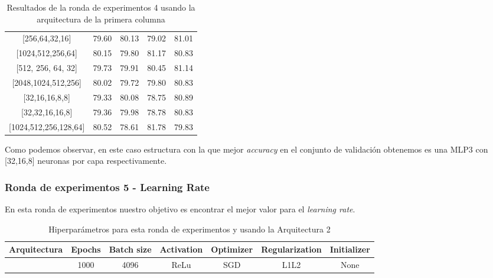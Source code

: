 \documentclass{article}
\begin{document}
\begin{center}
\begin{table}[h!]
\begin{tabular}{c|cccc}
{[}256,64,32,16{]}        & 79.60          & 80.13          & 79.02          & 81.01          \\
{[}1024,512,256,64{]}     & 80.15          & 79.80          & 81.17          & 80.83          \\
{[}512, 256, 64, 32{]}    & 79.73          & 79.91          & 80.45          & 81.14          \\
{[}2048,1024,512,256{]}   & 80.02          & 79.72          & 79.80          & 80.83          \\
{[}32,16,16,8,8{]}        & 79.33          & 80.08          & 78.75          & 80.89          \\
{[}32,32,16,16,8{]}       & 79.36          & 79.98          & 78.78          & 80.83          \\
{[}1024,512,256,128,64{]} & 80.52          & 78.61          & 81.78          & 79.83          \\ \hline
\end{tabular}

                \caption{Resultados de la ronda de experimentos 4 usando la arquitectura de la primera columna}
                \label{tab:res-j-a0-e4}
                \end{table}
                \end{center}
		    
		    Como podemos observar, en este caso estructura con la que mejor \textit{accuracy} en el conjunto de validaci\'on obtenemos es una MLP3 con [32,16,8] neuronas por capa respectivamente.
      \newpage
\subsubsection{Ronda de experimentos 5 - Learning Rate}  
En esta ronda de experimentos nuestro objetivo es encontrar el mejor valor para el \textit{learning rate}. 

			\begin{table}[h!]
				\begin{center}
					\begin{tabular}{| c | c | c | c | c | c | c |}
						\textbf{Arquitectura} & \textbf{Epochs} & \textbf{Batch size} & \textbf{Activation} & \textbf{Optimizer} & \textbf{Regularization} & \textbf{Initializer}\\ \hline
						[32,16,8] & 1000 & 4096 & ReLu & SGD & L1L2 & None
					\end{tabular}
					\caption{Hiperpar\'ametros para esta ronda de experimentos y usando la Arquitectura 2}
					\label{tab:hip-j-a0-e5}
				\end{center}
			\end{table}
			
\end{document}
